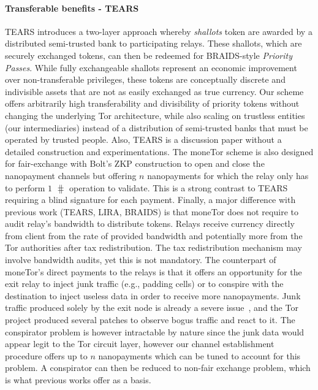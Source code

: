 \paragraph*{Transferable benefits - TEARS} TEARS introduces a two-layer approach whereby \emph{shallots}
token are awarded by a distributed semi-trusted bank to participating relays. These shallots,
which are securely exchanged tokens, can then be redeemed for BRAIDS-style
\emph{Priority Passes}. While fully exchangeable shallots represent an economic
improvement over non-transferable privileges, these tokens are conceptually
discrete and indivisible assets that are not as easily exchanged as true
currency. Our scheme offers arbitrarily high
transferability and divisibility of priority tokens without changing the
underlying Tor architecture, while also scaling on trustless entities (our intermediaries) instead of a distribution of semi-trusted banks that must be operated by trusted people. Also, TEARS is a discussion paper without a detailed construction and experimentations. The moneTor scheme is also designed for fair-exchange with Bolt's ZKP construction to open and close the nanopayment channels but offering $n$ nanopayments for which the relay only has to perform $1$ $\hash$ operation to validate. This is a strong contrast to TEARS requiring a blind signature for each payment. Finally, a major difference with previous work (TEARS, LIRA, BRAIDS) is that moneTor does not require to audit relay's bandwidth to distribute tokens. Relays receive currency directly from client from the rate of provided bandwidth and potentially more from the Tor authorities after tax redistribution. The tax redistribution mechanism may involve bandwidth audits, yet this is not mandatory. The counterpart of moneTor's direct payments to the relays is
that it offers an opportunity for the exit relay to inject junk
traffic (e.g., padding cells) or to conspire with the destination to
inject useless data in order to receive more nanopayments. Junk
traffic produced solely by the exit node is already a severe
issue~\cite{rochet2018dropping}, and the Tor project produced several
patches to observe bogus traffic and react to it. The conspirator
problem is however intractable by nature since the junk data would
appear legit to the Tor circuit layer, however our channel establishment procedure offers up to
$n$ nanopayments which can be tuned to account for this problem.  A
conspirator can then be reduced to non-fair exchange problem, which is
what previous works offer as a basis.



